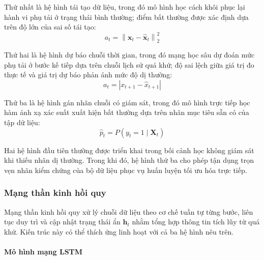 Thứ nhất là hệ hình tái tạo dữ liệu, trong đó mô hình học cách khôi phục lại hành vi phụ tải ở trạng thái bình thường; điểm bất thường được xác định dựa trên độ lớn của sai số tái tạo:
\begin{equation*}
    a_t = \left\| \mathbf{x}_t - \hat{\mathbf{x}}_t \right\|_2^2
\end{equation*}

Thứ hai là hệ hình dự báo chuỗi thời gian, trong đó mạng học sâu dự đoán mức phụ tải ở bước kế tiếp dựa trên chuỗi lịch sử quá khứ; độ sai lệch giữa giá trị đo thực tế và giá trị dự báo phản ánh mức độ dị thường:
\begin{equation*}
    a_t = \left| x_{t+1} - \hat{x}_{t+1} \right|
\end{equation*}

Thứ ba là hệ hình gán nhãn chuỗi có giám sát, trong đó mô hình trực tiếp học hàm ánh xạ xác suất xuất hiện bất thường dựa trên nhãn mục tiêu sẵn có của tập dữ liệu:
\begin{equation*}
    \hat{p}_t = P\left(y_t = 1 \mid \mathbf{X}_t\right)
\end{equation*}

Hai hệ hình đầu tiên thường được triển khai trong bối cảnh học không giám sát khi thiếu nhãn dị thường. Trong khi đó, hệ hình thứ ba cho phép tận dụng trọn vẹn nhãn kiểm chứng của bộ dữ liệu phục vụ huấn luyện tối ưu hóa trực tiếp.

\subsubsection{Mạng thần kinh hồi quy}

Mạng thần kinh hồi quy xử lý chuỗi dữ liệu theo cơ chế tuần tự từng bước, liên tục duy trì và cập nhật trạng thái ẩn $\mathbf{h}_t$ nhằm tổng hợp thông tin tích lũy từ quá khứ. Kiến trúc này có thể thích ứng linh hoạt với cả ba hệ hình nêu trên.

\paragraph{Mô hình mạng LSTM}

